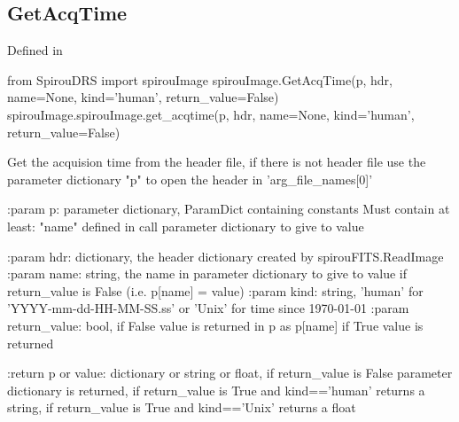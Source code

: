 \noindent\begin{minipage}{\textwidth}
\subsection{GetAcqTime}

Defined in \spirouImage{}

\begin{pythonbox}
from SpirouDRS import spirouImage
spirouImage.GetAcqTime(p, hdr, name=None, kind='human', return_value=False)
spirouImage.spirouImage.get_acqtime(p, hdr, name=None, kind='human', return_value=False)
\end{pythonbox}

\begin{pythondocstring}
Get the acquision time from the header file, if there is not header file
use the parameter dictionary "p" to open the header in 'arg_file_names[0]'

:param p: parameter dictionary, ParamDict containing constants
    Must contain at least:
        "name" defined in call
        parameter dictionary to give to value

:param hdr: dictionary, the header dictionary created by
            spirouFITS.ReadImage
:param name: string, the name in parameter dictionary to give to value
             if return_value is False (i.e. p[name] = value)
:param kind: string, 'human' for 'YYYY-mm-dd-HH-MM-SS.ss' or 'Unix'
             for time since 1970-01-01
:param return_value: bool, if False value is returned in p as p[name]
                     if True value is returned

:return p or value: dictionary or string or float, if return_value is False
                    parameter dictionary is returned, if return_value is
                    True and kind=='human' returns a string, if return_value
                    is True and kind=='Unix' returns a float
\end{pythondocstring}
\end{minipage}


